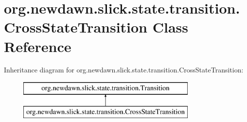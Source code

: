 \hypertarget{classorg_1_1newdawn_1_1slick_1_1state_1_1transition_1_1_cross_state_transition}{}\section{org.\+newdawn.\+slick.\+state.\+transition.\+Cross\+State\+Transition Class Reference}
\label{classorg_1_1newdawn_1_1slick_1_1state_1_1transition_1_1_cross_state_transition}
Inheritance diagram for org.\+newdawn.\+slick.\+state.\+transition.\+Cross\+State\+Transition\+:\begin{figure}[H]
\begin{center}
\leavevmode
\includegraphics[height=2.000000cm]{classorg_1_1newdawn_1_1slick_1_1state_1_1transition_1_1_cross_state_transition}
\end{center}
\end{figure}
